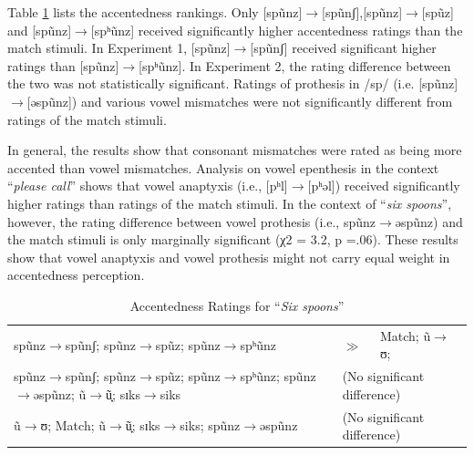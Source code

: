 Table \ref{table:ssp2} lists the accentedness rankings. Only [spũnz]$\rightarrow$[spũnʃ],[spũnz]$\rightarrow$[spũz] and  [spũnz]$\rightarrow$[spʰũnz] received significantly higher accentedness ratings than the match stimuli. In Experiment 1, [spũnz]$\rightarrow$[spũnʃ] received significant higher ratings than [spũnz]$\rightarrow$[spʰũnz]. In Experiment 2, the rating difference between the two was not statistically significant. Ratings of prothesis in /sp/ (i.e. [spũnz]$\rightarrow$[əspũnz]) and various vowel mismatches were not significantly different from ratings of the match stimuli.

In general, the results show that consonant mismatches were rated as being more accented than vowel mismatches. Analysis on vowel epenthesis in the context “\textit{please call}” shows that vowel anaptyxis (i.e., [pʰl]$\rightarrow$[pʰəl]) received significantly higher ratings than ratings of the match stimuli. In the context of “\textit{six spoons}”, however, the rating difference between vowel prothesis (i.e., spũnz$\rightarrow$əspũnz) and the match stimuli is only marginally significant (χ2 = 3.2, p =.06). These results show that vowel anaptyxis and vowel prothesis might not carry equal weight in accentedness perception.

\begin{table}[!h]
  \figSpace
  \centering
  \caption{Accentedness Ratings for “\textit{Six spoons}” }
  \label{table:ssp2}%
    \begin{tabular}{p{90mm}ll}
    \toprule
 	spũnz$\rightarrow$spũnʃ;  spũnz$\rightarrow$spũz;  spũnz$\rightarrow$spʰũnz & $\gg$ & Match; ũ$\rightarrow$ʊ;  \\
 	spũnz$\rightarrow$spũnʃ;  spũnz$\rightarrow$spũz;  spũnz$\rightarrow$spʰũnz; \newline
 	spũnz$\rightarrow$əspũnz; ũ$\rightarrow$ũ̟; sɪks$\rightarrow$siks&\multicolumn{2}{l}{(No significant difference)} \\
	ũ$\rightarrow$ʊ; Match; ũ$\rightarrow$ũ̟; sɪks$\rightarrow$siks; spũnz$\rightarrow$əspũnz&\multicolumn{2}{l}{(No significant difference)}\\
    \bottomrule
    \end{tabular}%
      \figSpace
\end{table}%

